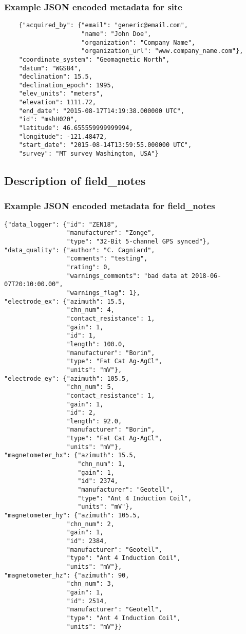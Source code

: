 \documentclass{article}
\begin{document}
\newpage
\subsubsection{Example JSON encoded metadata for \textbf{site}}
\begin{verbatim}
	{"acquired_by": {"email": "generic@email.com",
	                 "name": "John Doe",
	                 "organization": "Company Name",
	                 "organization_url": "www.company_name.com"},
	"coordinate_system": "Geomagnetic North",
	"datum": "WGS84",
	"declination": 15.5,
	"declination_epoch": 1995,
	"elev_units": "meters",
	"elevation": 1111.72,
	"end_date": "2015-08-17T14:19:38.000000 UTC",
	"id": "mshH020",
	"latitude": 46.655559999999994,
	"longitude": -121.48472,
	"start_date": "2015-08-14T13:59:55.000000 UTC",
	"survey": "MT survey Washington, USA"}
\end{verbatim}

\subsection{Description of \textbf{field\_notes}}

\newpage
\subsubsection{Example JSON encoded metadata for \textbf{field\_notes}}
\begin{verbatim}
{"data_logger": {"id": "ZEN18",
                 "manufacturer": "Zonge",
                 "type": "32-Bit 5-channel GPS synced"},
"data_quality": {"author": "C. Cagniard",
                 "comments": "testing",
                 "rating": 0,
                 "warnings_comments": "bad data at 2018-06-07T20:10:00.00",
                 "warnings_flag": 1},
"electrode_ex": {"azimuth": 15.5,
                 "chn_num": 4,
                 "contact_resistance": 1,
                 "gain": 1,
                 "id": 1,
                 "length": 100.0,
                 "manufacturer": "Borin",
                 "type": "Fat Cat Ag-AgCl",
                 "units": "mV"},
"electrode_ey": {"azimuth": 105.5,
                 "chn_num": 5,
                 "contact_resistance": 1,
                 "gain": 1,
                 "id": 2,
                 "length": 92.0,
                 "manufacturer": "Borin",
                 "type": "Fat Cat Ag-AgCl",
                 "units": "mV"},
"magnetometer_hx": {"azimuth": 15.5,
                    "chn_num": 1,
                    "gain": 1,
                    "id": 2374,
                    "manufacturer": "Geotell",
                    "type": "Ant 4 Induction Coil",
                    "units": "mV"},
"magnetometer_hy": {"azimuth": 105.5,
				 "chn_num": 2,
				 "gain": 1,
				 "id": 2384,
				 "manufacturer": "Geotell",
				 "type": "Ant 4 Induction Coil",
				 "units": "mV"},
"magnetometer_hz": {"azimuth": 90,
				 "chn_num": 3,
				 "gain": 1,
				 "id": 2514,
				 "manufacturer": "Geotell",
				 "type": "Ant 4 Induction Coil",
				 "units": "mV"}}
\end{verbatim}

       
\end{document}
